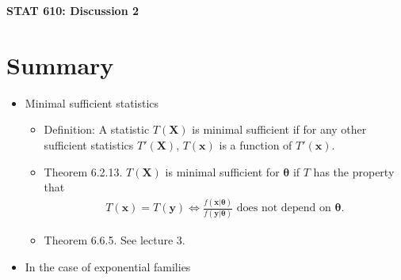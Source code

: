\documentclass[12pt]{extarticle}
\newcommand{\X}{\mathbf X}
\begin{document}
\begin{center}
{\large \bf STAT 610: Discussion 2}
\end{center}
\vspace{0.22cm}

\section{Summary}
\begin{itemize}
		\item Minimal sufficient statistics
	\begin{itemize}
		\item Definition: A statistic $T(\X)$ is minimal sufficient if for any other sufficient statistics $T'(\X)$, $T(\mathbf x)$ is a function of $T'(\mathbf x)$.
		\item Theorem 6.2.13. $T(\mathbf{X})$ is minimal sufficient for $\bm\theta$ if $T$ has the property that 
		\begin{align*}
		T(\mathbf{x})=T(\mathbf{y}) \Leftrightarrow \frac{f(\mathbf{x}|\bm\theta)}{f(\mathbf{y}|\bm\theta)} \text{  does not depend on } \bm\theta.
		\end{align*} 
		\item Theorem 6.6.5. See lecture 3.
	\end{itemize}
	
	\item In the case of exponential families
	

\end{itemize}
\end{document}
